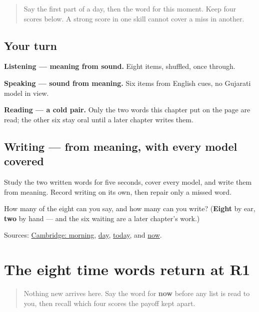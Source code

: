 \label{lesson:GU-C24-time-eight}



\begin{quote}
Say the first part of a day, then the word for this moment. Keep four scores below. A strong score in one skill cannot cover a miss in another.
\end{quote}

\subsection*{Your turn}
\textbf{Listening — meaning from sound.} Eight items, shuffled, once through.

\textbf{Speaking — sound from meaning.} Six items from English cues, no Gujarati model in view.

\textbf{Reading — a cold pair.} Only the two words this chapter put on the page are read; the other six stay oral until a later chapter writes them.

\subsection*{Writing — from meaning, with every model covered}
Study the two written words for five seconds, cover every model, and write them from meaning. Record writing on its own, then repair only a missed word.

\begin{tcolorbox}[breakable,colback=teal!4,colframe=teal!35!black,title={Before you move on}]
How many of the eight can you say, and how many can you write? (\textbf{Eight} by ear, \textbf{two} by hand — and the six waiting are a later chapter's work.)

Sources: \href{https://dictionary.cambridge.org/dictionary/english-gujarati/morning}{Cambridge: morning}, \href{https://dictionary.cambridge.org/dictionary/english-gujarati/day}{day}, \href{https://dictionary.cambridge.org/dictionary/english-gujarati/today}{today}, and \href{https://dictionary.cambridge.org/dictionary/english-gujarati/now}{now}.
\end{tcolorbox}
\section[Practice]{The eight time words return at R1}

\label{lesson:GU-R24-time-eight-r1}



\begin{quote}
Nothing new arrives here. Say the word for \textbf{now} before any list is read to you, then recall which four scores the payoff kept apart.
\end{quote}

